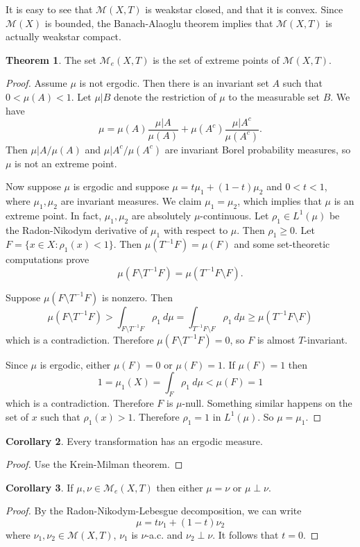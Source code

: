 \documentclass[12pt]{report}
\theoremstyle{definition}
\newtheorem{theorem}{Theorem}[chapter]
\newtheorem{corollary}[theorem]{Corollary}
\begin{document}
It is easy to see that $\mathcal M(X, T)$ is weakstar closed, and that it is convex. Since $\mathcal M(X)$ is bounded, the Banach-Alaoglu theorem implies that $\mathcal M(X, T)$ is actually weakstar compact.
\begin{theorem}
The set $\mathcal M_e(X, T)$ is the set of extreme points of $\mathcal M(X, T)$.
\end{theorem}
\begin{proof}
Assume $\mu$ is not ergodic. Then there is an invariant set $A$ such that $0 < \mu(A) < 1$. Let $\mu|B$ denote the restriction of $\mu$ to the measurable set $B$. We have
$$\mu = \mu(A)\frac{\mu|A}{\mu(A)} + \mu(A^c) \frac{\mu|A^c}{\mu(A^c)}.$$
Then $\mu|A/\mu(A)$ and $\mu|A^c/\mu(A^c)$ are invariant Borel probability measures, so $\mu$ is not an extreme point.

Now suppose $\mu$ is ergodic and suppose $\mu = t\mu_1 + (1-t)\mu_2$ and $0 < t < 1$, where $\mu_1,\mu_2$ are invariant measures. We claim $\mu_1 = \mu_2$, which implies that $\mu$ is an extreme point. In fact, $\mu_1,\mu_2$ are absolutely $\mu$-continuous.
Let $\rho_1 \in L^1(\mu)$ be the Radon-Nikodym derivative of $\mu_1$ with respect to $\mu$. Then $\rho_1 \geq 0$.
Let $F = \{x \in X: \rho_1(x) < 1\}$. Then $\mu(T^{-1}F) = \mu(F)$ and some set-theoretic computations prove
$$\mu(F \setminus T^{-1}F) = \mu(T^{-1}F \setminus F).$$

Suppose $\mu(F \setminus T^{-1}F)$ is nonzero. Then
$$\mu(F \setminus T^{-1}F) > \int_{F \setminus T^{-1}F} \rho_1 ~d\mu = \int_{T^{-1}F \setminus F} \rho_1 ~d\mu \geq \mu(T^{-1}F \setminus F)$$
which is a contradiction. Therefore $\mu(F \setminus T^{-1}F) = 0$, so $F$ is almost $T$-invariant.

Since $\mu$ is ergodic, either $\mu(F) = 0$ or $\mu(F) = 1$. If $\mu(F) = 1$ then
$$1 = \mu_1(X) = \int_F \rho_1 ~d\mu < \mu(F) = 1$$
which is a contradiction. Therefore $F$ is $\mu$-null. Something similar happens on the set of $x$ such that $\rho_1(x) > 1$. Therefore $\rho_1 = 1$ in $L^1(\mu)$. So $\mu = \mu_1$.
\end{proof}
\begin{corollary}
Every transformation has an ergodic measure.
\end{corollary}
\begin{proof}
Use the Krein-Milman theorem.
\end{proof}
\begin{corollary}
If $\mu,\nu \in \mathcal M_e(X, T)$ then either $\mu = \nu$ or $\mu \perp \nu$.
\end{corollary}
\begin{proof}
By the Radon-Nikodym-Lebesgue decomposition, we can write
$$\mu = t\nu_1 + (1 - t)\nu_2$$
where $\nu_1,\nu_2 \in \mathcal M(X, T)$, $\nu_1$ is $\nu$-a.c. and $\nu_2 \perp \nu$. It follows that $t = 0$.
\end{proof}
\end{document}
